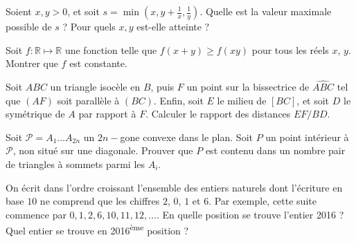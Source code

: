 \begin{exo}{}
Soient $x,y>0$, et soit $s=\min(x,y+\frac1x,\frac1y)$. Quelle est la valeur maximale possible de $s$ ? Pour quels $x,y$ est-elle atteinte ?
\end{exo}

\begin{exo}{ }
Soit $f : \mathbb{R} \mapsto \mathbb{R}$ une fonction telle que $f(x+y) \geq f(xy)$ pour tous les réels $x$, $y$.
Montrer que $f$ est constante.
\end{exo}

\begin{exo}{}
Soit $ABC$ un triangle isocèle en $B$, puis $F$ un point sur la bissectrice de $\widehat{ABC}$ tel que $(AF)$ soit parallèle à $(BC)$.
Enfin, soit $E$ le milieu de $[BC]$, et soit $D$ le symétrique de $A$ par rapport à $F$.
Calculer le rapport des distances $EF / BD$.
\end{exo}

\begin{exo}{}
Soit $\mathcal{P}=A_1\ldots A_{2n}$ un $2n-$gone convexe dans le plan. Soit $P$ un point intérieur à $\mathcal{P}$, non situé sur une diagonale. Prouver que $P$ est contenu dans un nombre pair de triangles à sommets parmi les $A_i$.
\end{exo}

\begin{exo}{}
On écrit dans l'ordre croissant l'ensemble des entiers naturels dont l'écriture en base $1$0 ne comprend que les chiffres $2$, $0$, $1$ et $6$. Par exemple, cette suite commence par $0, 1, 2, 6, 10, 11, 12, \ldots$. En quelle position se trouve l'entier 2016 ? Quel entier se trouve en 2016\textsuperscript{ème} position ?
\end{exo}

